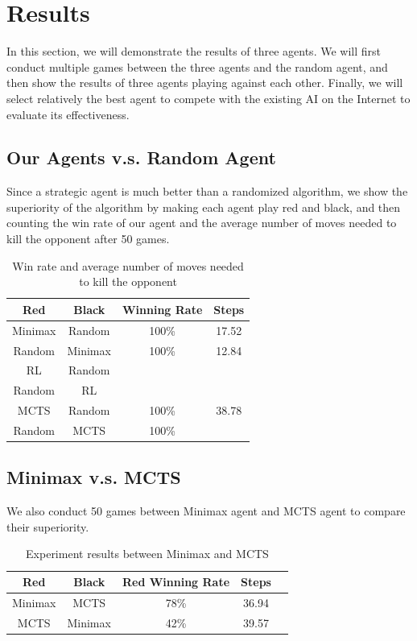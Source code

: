 \documentclass[letterpaper]{article}
\begin{document}
\section{Results}\label{sec:results}
In this section, we will demonstrate the results of three agents.
We will first conduct multiple games between the three agents and the random agent, and then show the results of three agents playing against each other.
Finally, we will select relatively the best agent to compete with the existing AI on the Internet to evaluate its effectiveness.

\subsection{Our Agents v.s. Random Agent}
\label{subsec:our-agents-vs-random-agent}
Since a strategic agent is much better than a randomized algorithm, we show the superiority of the algorithm by making each agent play red and black, and then counting the win rate of our agent and the average number of moves needed to kill the opponent after 50 games.
\begin{table}[htbp]
    \centering
    \caption{Win rate and average number of moves needed to kill the opponent}
    \label{tab:tab1}
    \begin{tabular}{|c|c|c|c|}
        \hline
        Red & Black & Winning Rate & Steps  \\ \hline
        Minimax & Random & 100\% & 17.52 \\ \hline
        Random & Minimax & 100\% & 12.84 \\ \hline
        RL & Random &  &  \\ \hline
        Random & RL &  & \\ \hline
        MCTS & Random & 100\% & 38.78\\ \hline
        Random & MCTS & 100\% & \\ \hline
    \end{tabular}
\end{table}

\subsection{Minimax v.s. MCTS}
\label{subsec:minimax-v.s.-mcts}
We also conduct 50 games between Minimax agent and MCTS agent to compare their superiority.
\begin{table}[htbp]
    \centering
    \caption{Experiment results between Minimax and MCTS}
    \label{tab:tab2}
    \begin{tabular}{|c|c|c|c|c|}
        \hline
        Red & Black & Red Winning Rate & Steps  \\ \hline
        Minimax & MCTS & 78\% & 36.94 \\ \hline
        MCTS & Minimax & 42\% & 39.57 \\ \hline
    \end{tabular}
\end{table}
\end{document}
